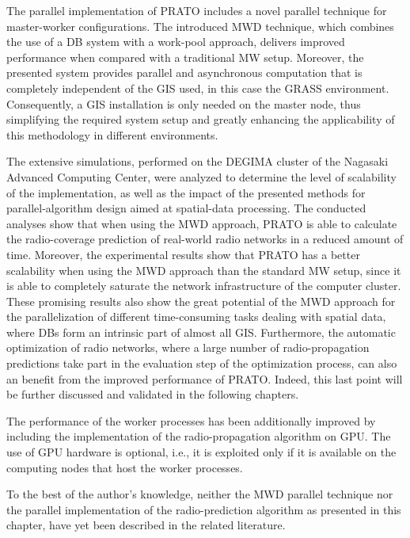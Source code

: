 The parallel implementation of PRATO includes a novel parallel technique
for master-worker configurations. The introduced MWD technique, which
combines the use of a DB system with a work-pool approach, delivers
improved performance when compared with a traditional MW setup. Moreover,
the presented system provides parallel and asynchronous computation
that is completely independent of the GIS used, in this case the GRASS
environment. Consequently, a GIS installation is only needed on the
master node, thus simplifying the required system setup and greatly
enhancing the applicability of this methodology in different environments.

The extensive simulations, performed on the DEGIMA cluster of the
Nagasaki Advanced Computing Center, were analyzed to determine the
level of scalability of the implementation, as well as the impact
of the presented methods for parallel-algorithm design aimed at spatial-data
processing. The conducted analyses show that when using the MWD approach,
PRATO is able to calculate the radio-coverage prediction of real-world
radio networks in a reduced amount of time. Moreover, the experimental
results show that PRATO has a better scalability when using the MWD
approach than the standard MW setup, since it is able to completely
saturate the network infrastructure of the computer cluster. These
promising results also show the great potential of the MWD approach
for the parallelization of different time-consuming tasks dealing
with spatial data, where DBs form an intrinsic part of almost all
GIS. Furthermore, the automatic optimization of radio networks, where
a large number of radio-propagation predictions take part in the evaluation
step of the optimization process, can also an benefit from the improved
performance of PRATO. Indeed, this last point will be further discussed
and validated in the following chapters.

The performance of the worker processes has been additionally improved
by including the implementation of the radio-propagation algorithm
on GPU. The use of GPU hardware is optional, i.e., it is exploited
only if it is available on the computing nodes that host the worker
processes.

To the best of the author's knowledge, neither the MWD parallel technique
nor the parallel implementation of the radio-prediction algorithm
as presented in this chapter, have yet been described in the related
literature.
